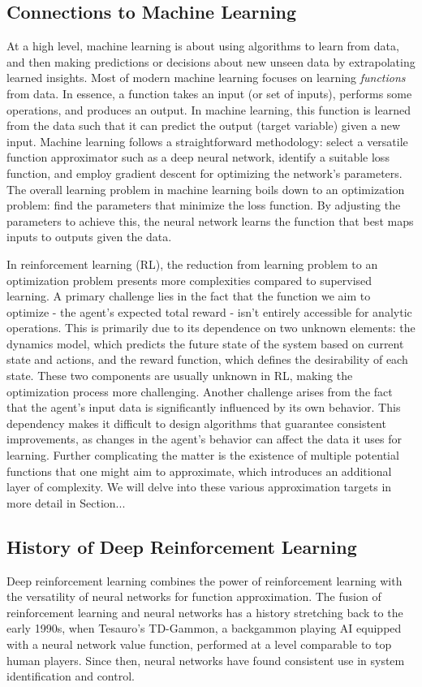 \subsection{Connections to Machine Learning }
At a high level, machine learning is about using algorithms to learn from data, and then making predictions or decisions about new unseen data by extrapolating learned insights. Most of modern machine learning focuses on learning \textit{functions} from data. In essence, a function takes an input (or set of inputs), performs some operations, and produces an output. In machine learning, this function is learned from the data such that it can predict the output (target variable) given a new input. 
Machine learning follows a straightforward methodology: select a versatile function approximator such as a deep neural network, identify a suitable loss function, and employ gradient descent for optimizing the network's parameters. The overall learning problem in machine learning boils down to an optimization problem: find the parameters that minimize the loss function. By adjusting the parameters to achieve this, the neural network learns the function that best maps inputs to outputs given the data.

In reinforcement learning (RL), the reduction from learning problem to an optimization problem presents more complexities compared to supervised learning. A primary challenge lies in the fact that the function we aim to optimize - the agent's expected total reward - isn't entirely accessible for analytic operations. This is primarily due to its dependence on two unknown elements: the dynamics model, which predicts the future state of the system based on current state and actions, and the reward function, which defines the desirability of each state. These two components are usually unknown in RL, making the optimization process more challenging. Another challenge arises from the fact that the agent's input data is significantly influenced by its own behavior. This dependency makes it difficult to design algorithms that guarantee consistent improvements, as changes in the agent's behavior can affect the data it uses for learning. Further complicating the matter is the existence of multiple potential functions that one might aim to approximate, which introduces an additional layer of complexity. We will delve into these various approximation targets in more detail in Section...

\subsection{History of Deep Reinforcement Learning}
Deep reinforcement learning combines the power of reinforcement learning with the versatility of neural networks for function approximation. The fusion of reinforcement learning and neural networks has a history stretching back to the early 1990s, when Tesauro’s TD-Gammon, a backgammon playing AI equipped with a neural network value function, performed at a level comparable to top human players. Since then, neural networks have found consistent use in system identification and control.

